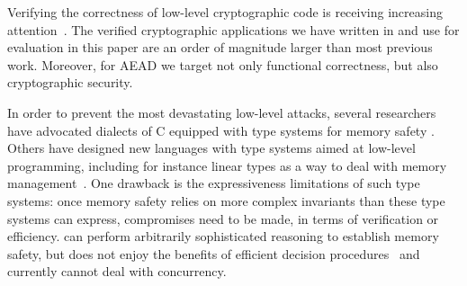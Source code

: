 \documentclass[acmsmall,review,anonymous]{acmart}\settopmatter{printfolios=true}
\begin{document}

Verifying the correctness of low-level cryptographic code is
receiving increasing attention~\cite{Appel15, cryptol-s2n,
  beringer2015verified}.
%
The verified cryptographic applications we have written in \lowstar
and use for evaluation in this paper are an order of magnitude larger
than most previous work.
%
Moreover, for AEAD we target not only functional correctness, but also
cryptographic security.


In order to prevent the most devastating low-level attacks, several researchers
have advocated dialects of C equipped with type systems for memory safety
\cite{condit2007dependent, jim2002cyclone, Tarditi16}.
Others have designed new languages with type
systems aimed at low-level programming, including for instance linear
types as a way to deal with memory
management~\cite{amani2016cogent, matsakis2014rust}. One drawback is
the expressiveness limitations of such type systems:
once memory safety relies on more complex invariants than these type
systems can express, compromises need to be made, in terms of
verification or efficiency.
%
\lowstar can perform arbitrarily sophisticated reasoning to establish
memory safety, but does not enjoy the benefits of efficient decision
procedures~\cite{rust} and currently cannot deal with concurrency.
\end{document}
